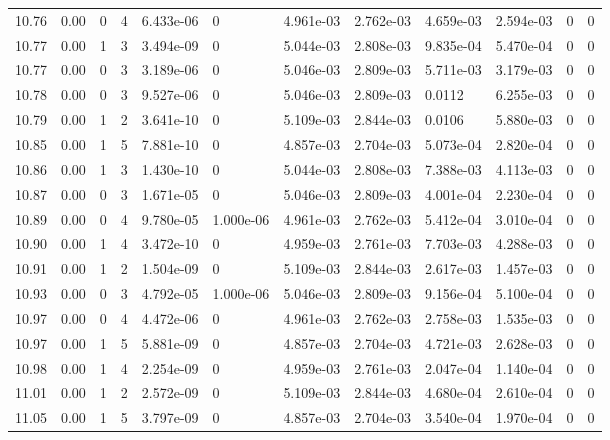 \documentclass[preview]{standalone}
\begin{document}
{{{{{{{{{{{{{{\begin{tabular}{L{1.2cm}C{1.2cm} C{0.3cm}C{0.5cm} C{1.4cm}C{1.4cm} C{1.4cm}C{1.4cm} C{1.6cm}C{1.6cm} C{1.6cm}C{1.6cm}}
  10.76  &  0.00  & 0     &  4 &  6.433e-06  & 0  &  4.961e-03&   2.762e-03& 4.659e-03 & 2.594e-03   &  0 & 0  \\ 
  10.77  &  0.00  & 1     &  3 &  3.494e-09  & 0  &  5.044e-03&   2.808e-03& 9.835e-04 & 5.470e-04   &  0 & 0  \\ 
  10.77  &  0.00  & 0     &  3 &  3.189e-06  & 0  &  5.046e-03&   2.809e-03& 5.711e-03 & 3.179e-03   &  0 & 0  \\ 
  10.78  &  0.00  & 0     &  3 &  9.527e-06  & 0  &  5.046e-03&   2.809e-03& 0.0112 & 6.255e-03   &  0 & 0  \\ 
  10.79  &  0.00  & 1     &  2 &  3.641e-10  & 0  &  5.109e-03&   2.844e-03& 0.0106 & 5.880e-03   &  0 & 0  \\ 
  10.85  &  0.00  & 1     &  5 &  7.881e-10  & 0  &  4.857e-03&   2.704e-03& 5.073e-04 & 2.820e-04   &  0 & 0  \\ 
  10.86  &  0.00  & 1     &  3 &  1.430e-10  & 0  &  5.044e-03&   2.808e-03& 7.388e-03 & 4.113e-03   &  0 & 0  \\ 
  10.87  &  0.00  & 0     &  3 &  1.671e-05  & 0  &  5.046e-03&   2.809e-03& 4.001e-04 & 2.230e-04   &  0 & 0  \\ 
  10.89  &  0.00  & 0     &  4 &  9.780e-05  & 1.000e-06  &  4.961e-03&   2.762e-03& 5.412e-04 & 3.010e-04   &  0 & 0  \\ 
  10.90  &  0.00  & 1     &  4 &  3.472e-10  & 0  &  4.959e-03&   2.761e-03& 7.703e-03 & 4.288e-03   &  0 & 0  \\ 
  10.91  &  0.00  & 1     &  2 &  1.504e-09  & 0  &  5.109e-03&   2.844e-03& 2.617e-03 & 1.457e-03   &  0 & 0  \\ 
  10.93  &  0.00  & 0     &  3 &  4.792e-05  & 1.000e-06  &  5.046e-03&   2.809e-03& 9.156e-04 & 5.100e-04   &  0 & 0  \\ 
  10.97  &  0.00  & 0     &  4 &  4.472e-06  & 0  &  4.961e-03&   2.762e-03& 2.758e-03 & 1.535e-03   &  0 & 0  \\ 
  10.97  &  0.00  & 1     &  5 &  5.881e-09  & 0  &  4.857e-03&   2.704e-03& 4.721e-03 & 2.628e-03   &  0 & 0  \\ 
  10.98  &  0.00  & 1     &  4 &  2.254e-09  & 0  &  4.959e-03&   2.761e-03& 2.047e-04 & 1.140e-04   &  0 & 0  \\ 
  11.01  &  0.00  & 1     &  2 &  2.572e-09  & 0  &  5.109e-03&   2.844e-03& 4.680e-04 & 2.610e-04   &  0 & 0  \\ 
  11.05  &  0.00  & 1     &  5 &  3.797e-09  & 0  &  4.857e-03&   2.704e-03& 3.540e-04 & 1.970e-04   &  0 & 0  \\ 

\end{tabular}}}}}}}}}}}}}}}
\end{document}
